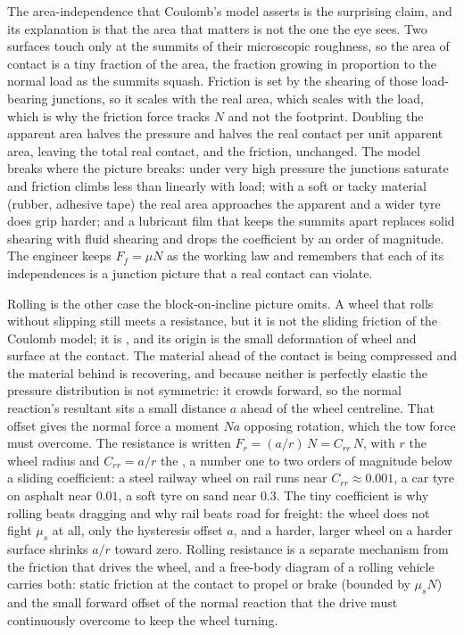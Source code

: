 The area-independence that Coulomb's model asserts is the surprising claim,
and its explanation is that the area that matters is not the one the eye sees.
Two surfaces touch only at the summits of their microscopic roughness, so the
 area of contact is a tiny fraction of the 
area, the fraction growing in proportion to the normal load as the summits
squash. Friction is set by the shearing of those load-bearing junctions, so it
scales with the real area, which scales with the load, which is why the
friction force tracks $N$ and not the footprint. Doubling the apparent area
halves the pressure and halves the real contact per unit apparent area, leaving
the total real contact, and the friction, unchanged. The model breaks where the
picture breaks: under very high pressure the junctions saturate and friction
climbs less than linearly with load; with a soft or tacky material (rubber,
adhesive tape) the real area approaches the apparent and a wider tyre does grip
harder; and a lubricant film that keeps the summits apart replaces solid
shearing with fluid shearing and drops the coefficient by an order of magnitude.
The engineer keeps $F_f = \mu N$ as the working law and remembers that each of
its independences is a junction picture that a real contact can violate.

Rolling is the other case the block-on-incline picture omits. A wheel that
rolls without slipping still meets a resistance, but it is not the sliding
friction of the Coulomb model; it is , and its
origin is the small deformation of wheel and surface at the contact. The
material ahead of the contact is being compressed and the material behind is
recovering, and because neither is perfectly elastic the pressure distribution
is not symmetric: it crowds forward, so the normal reaction's resultant sits a
small distance $a$ ahead of the wheel centreline. That offset gives the normal
force a moment $N a$ opposing rotation, which the tow force must overcome. The
resistance is written $F_r = (a/r)\,N = C_{rr}\,N$, with $r$ the wheel radius
and $C_{rr} = a/r$ the , a number
one to two orders of magnitude below a sliding coefficient: a steel railway
wheel on rail runs near $C_{rr} \approx 0.001$, a car tyre on asphalt near
$0.01$, a soft tyre on sand near $0.3$. The tiny coefficient is why rolling
beats dragging and why rail beats road for freight: the wheel does not fight
$\mu_s$ at all, only the hysteresis offset $a$, and a harder, larger wheel on a
harder surface shrinks $a/r$ toward zero. Rolling resistance is a separate
mechanism from the friction that drives the wheel, and a free-body diagram of a
rolling vehicle carries both: static friction at the contact to propel or brake
(bounded by $\mu_s N$) and the small forward offset of the normal reaction that
the drive must continuously overcome to keep the wheel turning.

